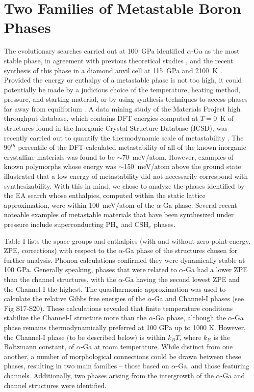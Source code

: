 \documentclass[reprint,aps,prl,twocolumn,letterpaper]{revtex4-2}
\begin{document}
\section{Two Families of Metastable Boron Phases}

The evolutionary searches carried out at 100~GPa identified $\alpha$-Ga as the most stable phase, in agreement with previous theoretical studies \cite{Haussermann:2003,Segall:2003,Fan:2014,Oganov:2009}, and the recent synthesis of this phase in a diamond anvil cell at 115~GPa and 2100~K \cite{Chuvashova:2017}. Provided the energy or enthalpy of a metastable phase is not too high, it could potentially be made by a judicious choice of the temperature, heating method, pressure, and starting material, or by using synthesis techniques to access phases far away from equilibrium \cite{Parija:2018a}. A data mining study of the Materials Project high throughput database, which contains DFT energies computed at $T=0$~K of structures found in the Inorganic Crystal Structure Database (ICSD), was recently carried out to quantify the thermodynamic scale of metastability \cite{materialsproject}. The 90$^{th}$ percentile of the DFT-calculated metastability of all of the known inorganic crystalline materials was found to be $\sim$70~meV/atom. However, examples of known polymorphs whose energy was $\sim$150~meV/atom above the ground state illustrated that  a low energy of metastability did not necessarily correspond with synthesizability. With this in mind, we chose to analyze the phases identified by the EA search whose enthalpies, computed within the static lattice approximation, were within 100~meV/atom of the $\alpha$-Ga phase. Several recent noteable examples of metastable materials that have been synthesized under pressure include superconducting PH$_n$ \cite{drozdov2015superconductivity,Zurek:2015j,Flores-Livas:2016,Zurek:2017c}  and CSH$_x$ \cite{Snider:2020a,Zurek:2020b,Sun:2020a} phases. 


Table I lists the space-groups and enthalpies (with and
without zero-point-energy, ZPE, corrections) with respect to the $\alpha$-Ga phase of the structures chosen for further analysis. Phonon calculations confirmed they were dynamically stable at 100 GPa. Generally speaking, phases that were related to $\alpha$-Ga had a lower ZPE
than the channel structures, with the $\alpha$-Ga having the second lowest ZPE and the Channel-I the highest. The quasiharmonic approximation was used to calculate the relative Gibbs free energies of the $\alpha$-Ga and Channel-I phases (see Fig S17-S20). These calculations revealed that finite temperature conditions stabilize the Channel-I structure more than the $\alpha$-Ga phase, although the $\alpha$-Ga phase remains thermodynamically preferred at 100 GPa up to 1000 K. However, the Channel-I phase (to be described below) is
within $k_{B}T$, where $k_{B}$ is the Boltzmann constant, of $\alpha$-Ga at room temperature. While distinct from one another, a number of morphological connections could be drawn between these phases, resulting in two main families -- those based on $\alpha$-Ga, and those featuring channels. Additionally, two phases arising from the intergrowth of the $\alpha$-Ga and channel structures were identified.
\end{document}
